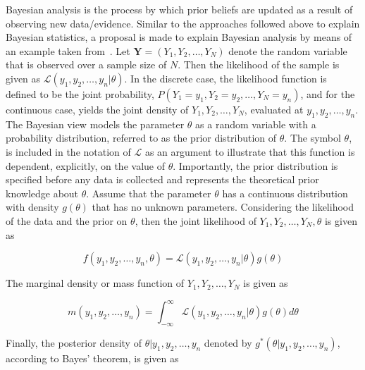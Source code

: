 Bayesian analysis is the process by which prior beliefs are updated as a result of observing new data/evidence. Similar to the approaches followed above to explain Bayesian statistics, a proposal is made to explain Bayesian analysis by means of an example taken from~\cite{ref:wackerly:2014}. Let $\boldsymbol{Y} = (Y_{1}, Y_{2}, \dots, Y_{N})$ denote the random variable that is observed over a sample size of $N$. Then the likelihood of the sample is given as $\mathcal{L}(y_{1}, y_{2}, \dots, y_{n} \vert \theta)$. In the discrete case, the likelihood function is defined to be the joint probability, $P(Y_{1} = y_{1}, Y_{2} = y_{2}, \dots, Y_{N} = y_{n})$, and for the continuous case, yields the joint density of $Y_{1}, Y_{2}, \dots, Y_{N}$, evaluated at $y_{1}, y_{2}, \dots, y_{n}$. The Bayesian view models the parameter $\theta$ as a random variable with a probability distribution, referred to as the prior distribution of $\theta$. The symbol $\theta$, is included in the notation of $\mathcal{L}$ as an argument to illustrate that this function is dependent, explicitly, on the value of $\theta$. Importantly, the prior distribution is specified before any data is collected and represents the theoretical prior knowledge about $\theta$. Assume that the parameter $\theta$ has a continuous distribution with density $g(\theta)$ that has no unknown parameters. Considering the likelihood of the data and the prior on $\theta$, then the joint likelihood of $Y_{1}, Y_{2}, \dots, Y_{N}, \theta$ is given as

\begin{equation}
	\label{eq:probability:bayesian_statistic:bayesian_analysis:joint_likelihood}
	f(y_{1}, y_{2}, \dots, y_{n}, \theta) = \mathcal{L}(y_{1}, y_{2}, \dots, y_{n} \vert \theta)g(\theta)
\end{equation}

The marginal density or mass function of $Y_{1}, Y_{2}, \dots, Y_{N}$ is given as

\begin{equation}
	\label{eq:probability:bayesian_statistic:bayesian_analysis:marginal_density}
	m(y_{1}, y_{2}, \dots, y_{n}) = \int_{-\infty}^{\infty} \mathcal{L}(y_{1}, y_{2}, \dots, y_{n} \vert \theta)g(\theta)d\theta
\end{equation}

Finally, the posterior density of $\theta \vert y_{1}, y_{2}, \dots, y_{n}$ denoted by $g^{*}(\theta \vert y_{1}, y_{2}, \dots, y_{n})$, according to Bayes' theorem, is given as

